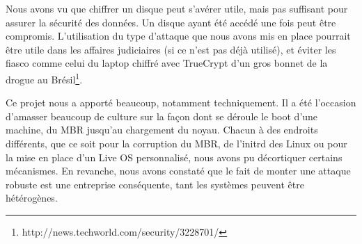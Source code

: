 \documentclass[12pt,a4paper]{article}
\begin{document}
Nous avons vu que chiffrer un disque peut s'avérer utile, mais pas suffisant
pour assurer la sécurité des données. Un disque ayant été accédé une fois peut
être compromis. L'utilisation du type d'attaque que nous avons mis en place
pourrait être utile dans les affaires judiciaires (si ce n'est pas déjà
utilisé), et éviter les fiasco comme celui du laptop chiffré avec TrueCrypt
d'un gros bonnet de la drogue au
Brésil\footnote{http://news.techworld.com/security/3228701/}.

Ce projet nous a apporté beaucoup, notamment techniquement. Il a été l'occasion
d'amasser beaucoup de culture sur la façon dont se déroule le boot d'une machine,
du MBR jusqu'au chargement du noyau. Chacun à des endroits différents, que ce
soit pour la corruption du MBR, de l'initrd des Linux ou pour la mise en place
d'un Live OS personnalisé, nous avons pu décortiquer certains mécanismes. En
revanche, nous avons constaté que le fait de monter une attaque robuste est une
entreprise conséquente, tant les systèmes peuvent être hétérogènes.
\end{document}
